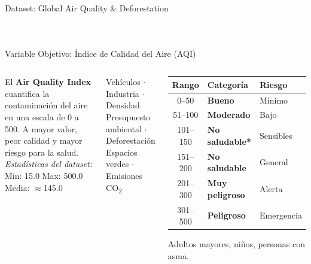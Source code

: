 \documentclass[aspectratio=169]{beamer}
\begin{document}
\begin{frame}{Dataset: Global Air Quality \& Deforestation}
\begin{columns}[T]
\begin{tcolorbox}[colback=grisclaro, colframe=black!25, title=\textbf{Variables (15 columnas)}]
\begin{tabular}{ll}
\end{tabular}
\end{tcolorbox}
\end{columns}
\end{frame}

\begin{frame}{Variable Objetivo: Índice de Calidad del Aire (AQI)}
\begin{columns}[T]
\vspace{-0.5cm}
\begin{tcolorbox}[colback=grisclaro, colframe=uaemcolor!60, title=\textbf{¿Qué es el AQI?}]
\small
El \textbf{Air Quality Index} cuantifica la contaminación del aire en una escala de 0 a 500. A mayor valor, peor calidad y mayor riesgo para la salud.\\[4pt]
\footnotesize\textit{Estadísticas del dataset:}\\
Min: 15.0 \quad Max: 500.0 \quad Media: $\approx$145.0
\end{tcolorbox}

\vspace{0.2cm}
\begin{tcolorbox}[colback=grisclaro, colframe=black!25, title=\textbf{Features predictoras}]
\small
Vehículos $\cdot$ Industria $\cdot$ Densidad\\
Presupuesto ambiental $\cdot$ Deforestación\\
Espacios verdes $\cdot$ Emisiones CO\textsubscript{2}
\end{tcolorbox}

\vspace{-0.5cm}
\begin{tcolorbox}[colback=grisclaro, colframe=black!25, title=\textbf{Categorías del AQI}]
\small
\begin{tabular}{cll}
\toprule
\textbf{Rango} & \textbf{Categoría} & \textbf{Riesgo} \\
\midrule
0--50   & {\color{verdeenv}\textbf{Bueno}}                & Mínimo \\
51--100  & {\color{yellow!60!black}\textbf{Moderado}}      & Bajo \\
101--150 & {\color{orange!80!black}\textbf{No saludable*}} & Sensibles \\
151--200 & {\color{red!70!black}\textbf{No saludable}}     & General \\
201--300 & {\color{purple!70!black}\textbf{Muy peligroso}} & Alerta \\
301--500 & {\color{black}\textbf{Peligroso}}               & Emergencia \\
\bottomrule
\end{tabular}
\vspace{3pt}
\footnotesize *Adultos mayores, niños, personas con asma.
\end{tcolorbox}


\end{columns}
\end{frame}
\end{document}
